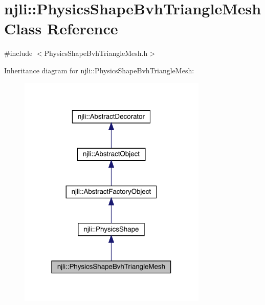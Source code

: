 \hypertarget{classnjli_1_1_physics_shape_bvh_triangle_mesh}{}\section{njli\+:\+:Physics\+Shape\+Bvh\+Triangle\+Mesh Class Reference}
\label{classnjli_1_1_physics_shape_bvh_triangle_mesh}


{\ttfamily \#include $<$Physics\+Shape\+Bvh\+Triangle\+Mesh.\+h$>$}



Inheritance diagram for njli\+:\+:Physics\+Shape\+Bvh\+Triangle\+Mesh\+:\nopagebreak
\begin{figure}[H]
\begin{center}
\leavevmode
\includegraphics[width=255pt]{classnjli_1_1_physics_shape_bvh_triangle_mesh__inherit__graph}
\end{center}
\end{figure}


